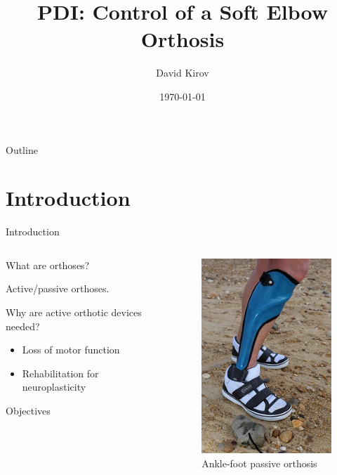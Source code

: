 \documentclass[aspectratio=169]{beamer}
\title{PDI: Control of a Soft Elbow Orthosis}
\author{David Kirov}
\date{\today}
\begin{document}
\begin{frame}
\titlepage
\end{frame}

\begin{frame}{Outline}
\tableofcontents
\end{frame}

\section{Introduction}
\begin{frame}{Introduction}
\begin{columns}
\begin{column}{0.6\textwidth}
What are orthoses?  

\bigskip 

Active/passive orthoses.  

\bigskip

Why are active orthotic devices needed?  
\begin{itemize}
  \item Loss of motor function
  \item Rehabilitation for neuroplasticity
\end{itemize}

\bigskip

Objectives

\end{column}
\begin{column}{0.4\textwidth}
\begin{figure}[htbp]
  \centering
  \includegraphics[width=0.6\linewidth]{passive_orthosis.jpg}
  \caption{Ankle-foot passive orthosis}
  \label{fig:passive_orthosis}
\end{figure}
\end{column}
\end{columns}
\end{frame}
\end{document}
